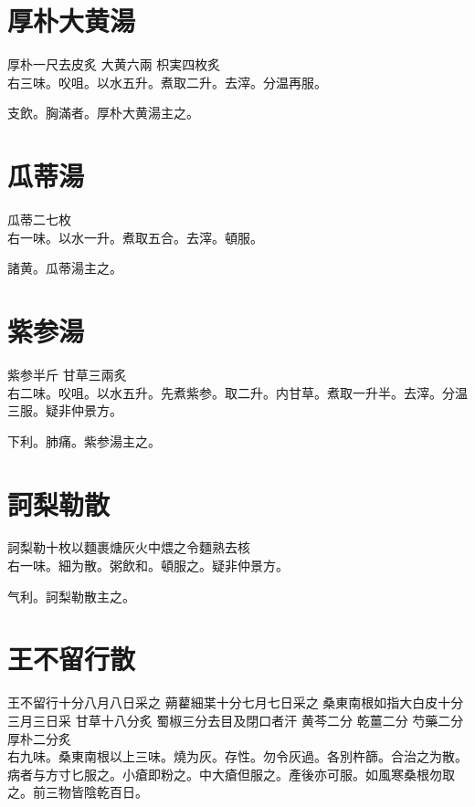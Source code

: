 \section{厚朴大黄湯}

厚朴{\scriptsize 一尺去皮炙} 大黄{\scriptsize 六兩} 枳実{\scriptsize 四枚炙}\\
右三味。㕮咀。以水五升。煮取二升。去滓。分温再服。

支飲。胸滿者。厚朴大黄湯主之。

\section{瓜蒂湯}

瓜蒂{\scriptsize 二七枚}\\
右一味。以水一升。煮取五合。去滓。頓服。

諸黄。瓜蒂湯主之。

\section{紫参湯}

紫参{\scriptsize 半斤} 甘草{\scriptsize 三兩炙}\\
右二味。㕮咀。以水五升。先煮紫参。取二升。内甘草。煮取一升半。去滓。分温三服。{\scriptsize 疑非仲景方。}

下利。肺痛。紫参湯主之。

\section{訶梨勒散}

訶梨勒{\scriptsize 十枚以麵裹煻灰火中煨之令麵熟去核}\\
右一味。細为散。粥飲和。頓服之。{\scriptsize 疑非仲景方。}

气利。訶梨勒散主之。

\section{王不留行散}

王不留行{\scriptsize 十分八月八日采之} 蒴藋細枼{\scriptsize 十分七月七日采之} 桑東南根{\scriptsize 如指大白皮十分三月三日采} 甘草{\scriptsize 十八分炙} 蜀椒{\scriptsize 三分去目及閉口者汗} 黄芩{\scriptsize 二分} 乾薑{\scriptsize 二分} 芍藥{\scriptsize 二分} 厚朴{\scriptsize 二分炙}\\
右九味。桑東南根以上三味。燒为灰。存性。勿令灰過。各別杵篩。合治之为散。病者与方寸匕服之。小瘡即粉之。中大瘡但服之。產後亦可服。如風寒桑根勿取之。前三物皆陰乾百日。

